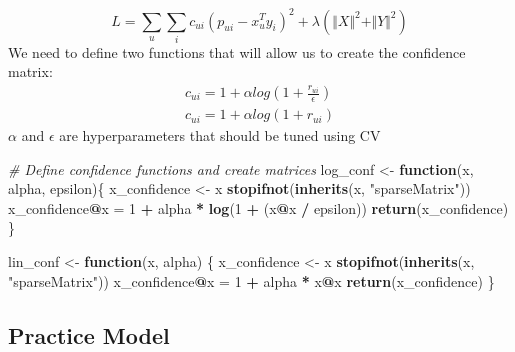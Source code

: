 \documentclass[]{article}
\newenvironment{Shaded}{\begin{snugshade}}{\end{snugshade}}
\newcommand{\KeywordTok}[1]{\textcolor[rgb]{0.13,0.29,0.53}{\textbf{#1}}}
\newcommand{\DecValTok}[1]{\textcolor[rgb]{0.00,0.00,0.81}{#1}}
\newcommand{\StringTok}[1]{\textcolor[rgb]{0.31,0.60,0.02}{#1}}
\newcommand{\CommentTok}[1]{\textcolor[rgb]{0.56,0.35,0.01}{\textit{#1}}}
\newcommand{\ControlFlowTok}[1]{\textcolor[rgb]{0.13,0.29,0.53}{\textbf{#1}}}
\newcommand{\OperatorTok}[1]{\textcolor[rgb]{0.81,0.36,0.00}{\textbf{#1}}}
\newcommand{\NormalTok}[1]{#1}
\begin{document}
\[
L = \sum_u\sum_ic_{ui}(p_{ui} - x^{T}_uy_i)^2 + \lambda(\Vert{X}\Vert^2 + \Vert{Y}\Vert^2)
\] We need to define two functions that will allow us to create the
confidence matrix: \[
\begin{aligned}
c_{ui} = 1 + \alpha log(1 + \frac{r_{ui}}{\epsilon}) \\
c_{ui} = 1 + \alpha log(1 + r_{ui})
\end{aligned}
\] \(\alpha\) and \(\epsilon\) are hyperparameters that should be tuned
using CV

\begin{Shaded}
\begin{Highlighting}[]
\CommentTok{# Define confidence functions and create matrices}
\NormalTok{log_conf <-}\StringTok{  }\ControlFlowTok{function}\NormalTok{(x, alpha, epsilon)\{}
\NormalTok{  x_confidence <-}\StringTok{  }\NormalTok{x}
  \KeywordTok{stopifnot}\NormalTok{(}\KeywordTok{inherits}\NormalTok{(x, }\StringTok{"sparseMatrix"}\NormalTok{))}
\NormalTok{  x_confidence}\OperatorTok{@}\NormalTok{x =}\StringTok{ }\DecValTok{1} \OperatorTok{+}\StringTok{ }\NormalTok{alpha }\OperatorTok{*}\StringTok{ }\KeywordTok{log}\NormalTok{(}\DecValTok{1} \OperatorTok{+}\StringTok{ }\NormalTok{(x}\OperatorTok{@}\NormalTok{x }\OperatorTok{/}\StringTok{ }\NormalTok{epsilon))}
  \KeywordTok{return}\NormalTok{(x_confidence)}
\NormalTok{\}}

\NormalTok{lin_conf <-}\StringTok{ }\ControlFlowTok{function}\NormalTok{(x, alpha) \{}
\NormalTok{  x_confidence <-}\StringTok{ }\NormalTok{x}
  \KeywordTok{stopifnot}\NormalTok{(}\KeywordTok{inherits}\NormalTok{(x, }\StringTok{"sparseMatrix"}\NormalTok{))}
\NormalTok{  x_confidence}\OperatorTok{@}\NormalTok{x =}\StringTok{ }\DecValTok{1} \OperatorTok{+}\StringTok{ }\NormalTok{alpha }\OperatorTok{*}\StringTok{ }\NormalTok{x}\OperatorTok{@}\NormalTok{x}
  \KeywordTok{return}\NormalTok{(x_confidence)}
\NormalTok{\}}
\end{Highlighting}
\end{Shaded}

\subsection{Practice Model}\label{practice-model}
\end{document}
